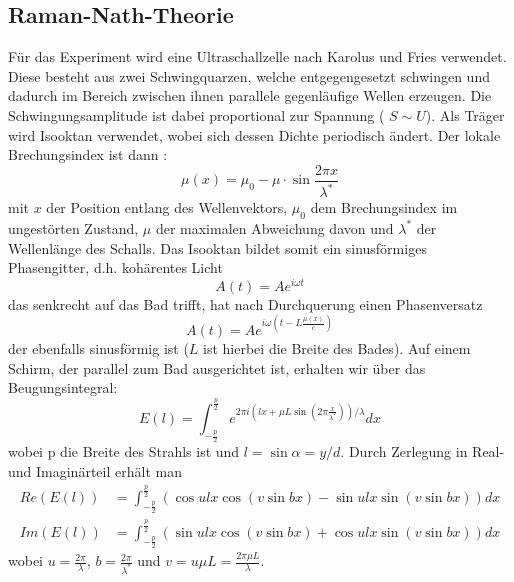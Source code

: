 \subsection{Raman-Nath-Theorie}
Für das Experiment wird eine Ultraschallzelle nach Karolus und Fries \cite{Karolus} verwendet. Diese besteht aus zwei Schwingquarzen, welche entgegengesetzt schwingen und dadurch im Bereich zwischen ihnen parallele gegenläufige Wellen erzeugen. Die Schwingungsamplitude ist dabei proportional zur Spannung ( $S \sim U$). Als Träger wird Isooktan verwendet, wobei sich dessen Dichte periodisch ändert. Der lokale Brechungsindex ist dann \cite{Raman}: 
\begin{equation}
 \mu \left( x \right) = \mu_0 - \mu \cdot \sin \frac{2 \pi x}{ \lambda^*}
\end{equation}
mit $x$ der Position entlang des Wellenvektors, $\mu_0$ dem Brechungsindex im ungestörten Zustand, $\mu$ der maximalen Abweichung davon und $\lambda^*$ der Wellenlänge des Schalls. Das Isooktan bildet somit ein sinusförmiges Phasengitter, d.h. kohärentes Licht
\begin{equation}
 A \left( t \right) = A e^{i \omega t}
\end{equation}
das senkrecht auf das Bad trifft, hat nach Durchquerung einen Phasenversatz
\begin{equation}
 A \left( t \right) = A e^{i \omega \left( t - L \frac{\mu \left( x \right)}{c} \right)}
\end{equation}
der ebenfalls sinusförmig ist ($L$ ist hierbei die Breite des Bades). 
Auf einem Schirm, der parallel zum Bad ausgerichtet ist, erhalten wir über das Beugungsintegral:
\begin{equation}
 E\left( l \right) = \int_{-\frac{p}{2}}^{\frac{p}{2}} e^{2 \pi i \left( l x + \mu L \sin \left( 2 \pi \frac{x}{\lambda^*} \right) \right) / \lambda } dx
\end{equation}
wobei p die Breite des Strahls ist und $l = \sin \alpha = y / d$. Durch Zerlegung in Real- und Imaginärteil erhält man
\begin{align}
 Re \left( E \left( l \right) \right) & = \int_{-\frac{p}{2}}^{\frac{p}{2}} \left( \cos ulx \cos \left( v \sin bx \right) - \sin ulx \sin \left( v \sin bx \right) \right) dx \\
Im \left( E \left( l \right) \right) & = \int_{-\frac{p}{2}}^{\frac{p}{2}} \left( \sin ulx \cos \left( v \sin bx \right) + \cos ulx \sin \left( v \sin bx \right) \right) dx
\end{align}
wobei $u = \frac{2 \pi}{\lambda}$, $b = \frac{2 \pi}{\lambda^*}$ und $v= u \mu L = \frac{2 \pi \mu L}{\lambda}$.
